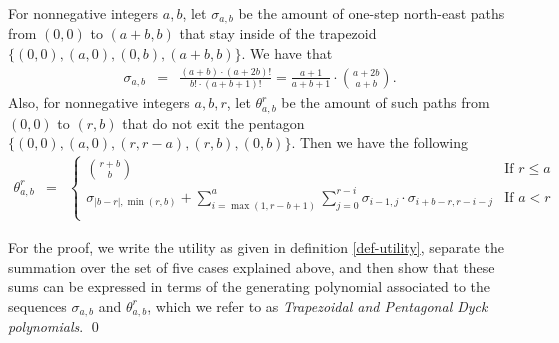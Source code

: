 \begin{lemma} For nonnegative
    integers $a,b$, let $\sigma_{a,b}$ be the amount of one-step north-east
    paths from $(0,0)$ to $(a+b,b)$ that stay inside of the trapezoid
    $\{(0,0),(a,0),(0,b),(a+b,b)\}.$ We have that
\begin{eqnarray*}
\sigma_{a,b} & = & \frac{(a+b)\cdot(a+2b)!}{b!\cdot(a+b+1)!}=\frac{a+1}{a+b+1}\cdot {a+2b\choose a+b}.
\end{eqnarray*}
    Also, for nonnegative integers $a,b,r$, let $\theta_{a,b}^r$ be the
 amount of such paths from $(0,0)$ to $(r,b)$ that do not exit the pentagon
 $\{(0,0),(a,0),(r,r-a),(r,b),(0,b)\}$. Then we have the following
\begin{eqnarray*}
\theta_{a,b}^r & = & 
 \begin{cases}
 {\displaystyle {r+b\choose b}} & \text{If } r \leq a\\
 {\displaystyle \sigma_{|b-r|,\min(r,b)} + \sum_{i=\max(1,r-b+1)}^a  \sum_{j=0}^{r-i}\sigma_{i-1,j}\cdot \sigma_{i+b-r,r-i-j}} &  \text{If } a<r\\
 \end{cases}
 \end{eqnarray*}
 \end{lemma}
 For the proof, we write the utility as given in definition \ref{def-utility}, separate the summation 
 over the set of five cases explained above, and then show that these sums can be expressed in terms of the 
 generating polynomial associated to the sequences $\sigma_{a,b}$ and $\theta_{a,b}^r$, which we
refer to as \textit{Trapezoidal and Pentagonal Dyck polynomials}.
\qed

\medskip

